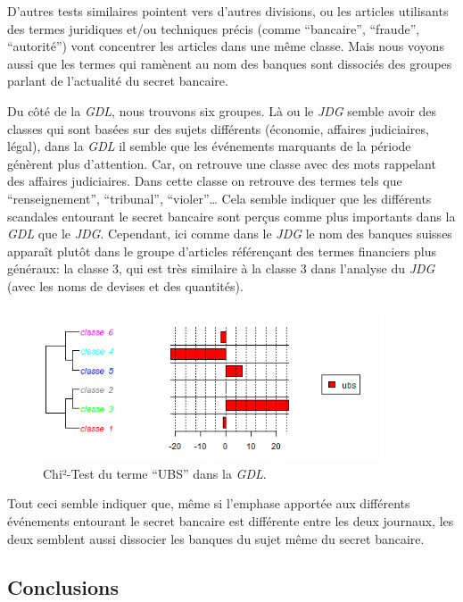 \documentclass[a4paper, 11pt]{article}
\begin{document}
D'autres tests similaires pointent vers d'autres divisions, ou les
articles utilisants des termes juridiques et/ou techniques précis (comme
``bancaire'', ``fraude'', ``autorité'') vont concentrer les articles
dans une même classe. Mais nous voyons aussi que les termes qui ramènent
au nom des banques sont dissociés des groupes parlant de l'actualité du
secret bancaire.

Du côté de la \emph{GDL}, nous trouvons six groupes. Là ou le \emph{JDG}
semble avoir des classes qui sont basées sur des sujets différents
(économie, affaires judiciaires, légal), dans la \emph{GDL} il semble
que les événements marquants de la période génèrent plus d'attention.
Car, on retrouve une classe avec des mots rappelant des affaires
judiciaires. Dans cette classe on retrouve des termes tels que
``renseignement'', ``tribunal'', ``violer''\ldots{} Cela semble indiquer
que les différents scandales entourant le secret bancaire sont perçus
comme plus importants dans la \emph{GDL} que le \emph{JDG}. Cependant,
ici comme dans le \emph{JDG} le nom des banques suisses apparaît plutôt
dans le groupe d'articles référençant des termes financiers plus
généraux: la classe 3, qui est très similaire à la classe 3 dans
l'analyse du \emph{JDG} (avec les noms de devises et des quantités).

\begin{figure}
\centering
\includegraphics[width=0.9\textwidth ]{analysis/ubs_chisquare_gdl.png}
\caption{Chi²-Test du terme ``UBS'' dans la \emph{GDL}.}
\end{figure}

Tout ceci semble indiquer que, même si l'emphase apportée aux différents
événements entourant le secret bancaire est différente entre les deux
journaux, les deux semblent aussi dissocier les banques du sujet même du
secret bancaire.

\hypertarget{conclusions}{%
\subsection{Conclusions}\label{conclusions}}
\end{document}
